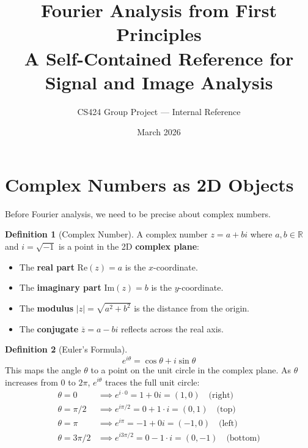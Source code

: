 \documentclass[11pt,a4paper]{article}
\title{\textbf{Fourier Analysis from First Principles} \\[0.5em]
\Large A Self-Contained Reference for Signal and Image Analysis}
\author{CS424 Group Project --- Internal Reference}
\date{March 2026}
\theoremstyle{definition}
\newtheorem{definition}{Definition}[section]
\begin{document}
\maketitle
\tableofcontents
\newpage

\section{Complex Numbers as 2D Objects}

Before Fourier analysis, we need to be precise about complex numbers.

\begin{definition}[Complex Number]
A complex number $z = a + bi$ where $a, b \in \mathbb{R}$ and $i = \sqrt{-1}$ is a point in the 2D \textbf{complex plane}:
\begin{itemize}
    \item The \textbf{real part} $\mathrm{Re}(z) = a$ is the $x$-coordinate.
    \item The \textbf{imaginary part} $\mathrm{Im}(z) = b$ is the $y$-coordinate.
    \item The \textbf{modulus} $|z| = \sqrt{a^2 + b^2}$ is the distance from the origin.
    \item The \textbf{conjugate} $\overline{z} = a - bi$ reflects across the real axis.
\end{itemize}
\end{definition}

\begin{definition}[Euler's Formula]
\begin{equation}
    e^{i\theta} = \cos\theta + i\sin\theta
\end{equation}
This maps the angle $\theta$ to a point on the unit circle in the complex plane. As $\theta$ increases from $0$ to $2\pi$, $e^{i\theta}$ traces the full unit circle:
\begin{align}
    \theta = 0 &\implies e^{i \cdot 0} = 1 + 0i = (1, 0) \quad\text{(right)} \\
    \theta = \pi/2 &\implies e^{i\pi/2} = 0 + 1 \cdot i = (0, 1) \quad\text{(top)} \\
    \theta = \pi &\implies e^{i\pi} = -1 + 0i = (-1, 0) \quad\text{(left)} \\
    \theta = 3\pi/2 &\implies e^{i3\pi/2} = 0 - 1 \cdot i = (0, -1) \quad\text{(bottom)}
\end{align}
\end{definition}
\end{document}
